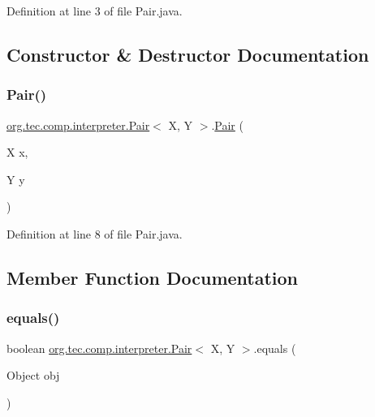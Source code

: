 Definition at line 3 of file Pair.\+java.



\subsection{Constructor \& Destructor Documentation}
\mbox{\label{classorg_1_1tec_1_1comp_1_1interpreter_1_1_pair_a3d5b15d07c3d8dacf60cb8bd98a42ea5}} 
\subsubsection{\texorpdfstring{Pair()}{Pair()}}
{\footnotesize\ttfamily \mbox{\hyperlink{classorg_1_1tec_1_1comp_1_1interpreter_1_1_pair}{org.\+tec.\+comp.\+interpreter.\+Pair}}$<$ X, Y $>$.\mbox{\hyperlink{classorg_1_1tec_1_1comp_1_1interpreter_1_1_pair}{Pair}} (\begin{DoxyParamCaption}\item[{X}]{x,  }\item[{Y}]{y }\end{DoxyParamCaption})\hspace{0.3cm}{\ttfamily [inline]}}



Definition at line 8 of file Pair.\+java.



\subsection{Member Function Documentation}
\mbox{\label{classorg_1_1tec_1_1comp_1_1interpreter_1_1_pair_af010962720e33a5802bc14055adb9c9d}} 
\subsubsection{\texorpdfstring{equals()}{equals()}}
{\footnotesize\ttfamily boolean \mbox{\hyperlink{classorg_1_1tec_1_1comp_1_1interpreter_1_1_pair}{org.\+tec.\+comp.\+interpreter.\+Pair}}$<$ X, Y $>$.equals (\begin{DoxyParamCaption}\item[{Object}]{obj }\end{DoxyParamCaption})\hspace{0.3cm}{\ttfamily [inline]}}



